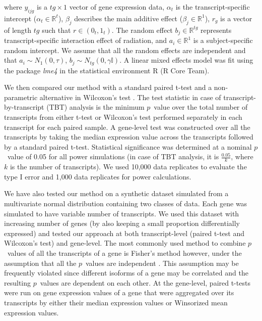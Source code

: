 \documentclass[hidelinks,11pt]{article}
\begin{document}
where $y_{ijg}$ is a $tg \times 1$ vector of gene expression data, $\alpha_t$ is the transcript-specific intercept ($\alpha_t \in \mathbb{R}^t$), $\beta_j$ describes the main additive effect ($\beta_j \in \mathbb{R}^1$), $r_g$ is a vector of length $tg$ such that $r \in \left(0_{t},1_{t}\right)$. The random effect $b_j \in \mathbb{R}^{tg}$ represents transcript-specific interaction effect of radiation, and $a_i \in \mathbb{R}^1$ is a subject-specific random intercept. We assume that all the random effects are independent and that $a_i \sim N_1 \left(0, \tau \right)$, $b_j \sim N_{tg} \left(0, \gamma\mathbb{I} \right)$. A linear mixed effects model was fit using the package \emph{lme4}\cite{lme4} in the statistical environment R (R Core Team). 

We then compared our method with a standard paired t-test and a non-parametric alternative in Wilcoxon's test \cite{wilcoxon}. The test statistic in case of transcript-by-transcript (TBT) analysis is the minimum $p$~value over the total number of transcripts from either t-test or Wilcoxon's test performed separately in each transcript for each paired sample. A gene-level test was constructed over all the transcripts by taking the median expression value across the transcripts followed by a standard paired t-test. Statistical significance was determined at a nominal $p$~value of 0.05 for all power simulations (in case of TBT analysis, it is $\frac{0.05}{k}$,  where $k$ is the number of transcripts). We used 10,000 data replicates to evaluate the type I error and 1,000 data replicates for power calculations. 

We have also tested our method on a synthetic dataset simulated from a multivariate normal distribution containing two classes of data. Each gene was simulated to have variable number of transcripts. We used this dataset with increasing number of genes (by also keeping a small proportion differentially expressed) and tested our approach at both transcript-level (paired t-test and Wilcoxon's test) and gene-level. The most commonly used method to combine $p$~values of all the transcripts of a gene is Fisher's method however, under the assumption that all the $p$~values are independent \cite{fisher}. This assumption may be frequently violated since different isoforms of a gene may be correlated and the resulting $p$~values are dependent on each other. At the gene-level, paired t-tests were run on gene expression values of a gene that were aggregated over its transcripts by either their median expression values or Winsorized mean \cite{winsor} expression values.
\end{document}
